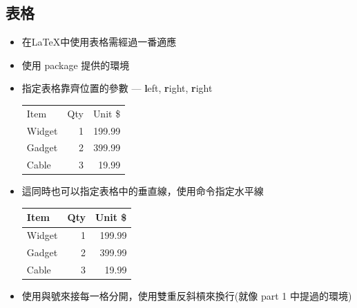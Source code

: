 \documentclass{beamer}
\begin{document}
\subsection{表格}
\begin{frame}[fragile]{\insertsubsection}
\begin{itemize}
\item 在\LaTeX{}中使用表格需經過一番適應
\item 使用 package 提供的環境
\item 指定表格靠齊位置的參數 --- \textbf{l}eft, \textbf{r}ight, \textbf{r}ight
\begin{exampletwouptiny}
\begin{tabular}{lrr}
Item   & Qty & Unit \$ \\
Widget & 1   & 199.99  \\
Gadget & 2   & 399.99  \\
Cable  & 3   & 19.99   \\
\end{tabular}
\end{exampletwouptiny}
\item 這同時也可以指定表格中的垂直線，使用命令指定水平線
\begin{exampletwouptiny}
\begin{tabular}{|l|r|r|} \hline
Item   & Qty & Unit \$ \\\hline
Widget & 1   & 199.99  \\
Gadget & 2   & 399.99  \\
Cable  & 3   & 19.99   \\\hline
\end{tabular}
\end{exampletwouptiny}
\item 使用與號\keystrokebftt{\&}來接每一格分開，使用雙重反斜槓\keystrokebftt{\bs}\keystrokebftt{\bs}來換行(就像 part 1 中提過的環境)
\end{itemize}
\end{frame}

\end{document}
